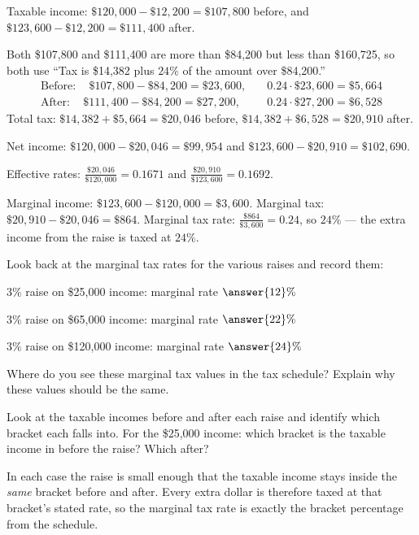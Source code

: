 \documentclass[12pt]{ximera}
\begin{document}
\begin{problem}
\begin{solution}
Taxable income: $\$120{,}000 - \$12{,}200 = \$107{,}800$ before, and
$\$123{,}600 - \$12{,}200 = \$111{,}400$ after.

Both \$107,800 and \$111,400 are more than \$84,200 but less than \$160,725, so both
use ``Tax is \$14,382 plus $24\%$ of the amount over \$84,200.''
\[
\begin{aligned}
\text{Before}: \quad \$107{,}800 - \$84{,}200 = \$23{,}600, &\quad 0.24 \cdot \$23{,}600 = \$5{,}664 \\
\text{After}: \quad \$111{,}400 - \$84{,}200 = \$27{,}200, &\quad 0.24 \cdot \$27{,}200 = \$6{,}528
\end{aligned}
\]
Total tax: $\$14{,}382 + \$5{,}664 = \$20{,}046$ before,
$\$14{,}382 + \$6{,}528 = \$20{,}910$ after.

Net income: $\$120{,}000 - \$20{,}046 = \$99{,}954$ and
$\$123{,}600 - \$20{,}910 = \$102{,}690$.

Effective rates: $\frac{\$20{,}046}{\$120{,}000} = 0.1671$ and
$\frac{\$20{,}910}{\$123{,}600} = 0.1692$.

Marginal income: $\$123{,}600 - \$120{,}000 = \$3{,}600$.
Marginal tax: $\$20{,}910 - \$20{,}046 = \$864$.
Marginal tax rate: $\frac{\$864}{\$3{,}600} = 0.24$, so $24\%$ --- the extra income
from the raise is taxed at $24\%$.
\end{solution}
\end{problem}

\begin{problem}
Look back at the marginal tax rates for the various raises and record them:

$3\%$ raise on \$25,000 income: marginal rate $\answer{12}\%$

$3\%$ raise on \$65,000 income: marginal rate $\answer{22}\%$

$3\%$ raise on \$120,000 income: marginal rate $\answer{24}\%$

Where do you see these marginal tax values in the tax schedule? Explain why these
values should be the same.

\begin{hint}
Look at the taxable incomes before and after each raise and identify which bracket
each falls into. For the \$25,000 income: which bracket is the taxable income in
before the raise? Which after?
\end{hint}

\begin{freeResponse}
\end{freeResponse}

\begin{solution}
In each case the raise is small enough that the taxable income stays inside the
\emph{same} bracket before and after. Every extra dollar is therefore taxed at that
bracket's stated rate, so the marginal tax rate is exactly the bracket percentage
from the schedule.
\end{solution}
\end{problem}
\end{document}
